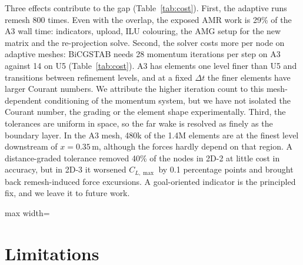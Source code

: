 \documentclass[preprint,12pt,number]{elsarticle}
\newcommand{\fittable}[1]{{\small\setlength{\tabcolsep}{4pt}\begin{adjustbox}{max width=\textwidth}\end{adjustbox}}}
\newcommand{\dt}{\Delta t}
\begin{document}
Three effects contribute to the gap (Table~\ref{tab:cost}). First, the adaptive runs remesh 800
times. Even with the overlap, the exposed AMR work is 29\% of the A3 wall time: indicators,
upload, ILU colouring, the AMG setup for the new matrix and the re-projection solve. Second,
the solver costs more per node on adaptive meshes: BiCGSTAB needs 28 momentum iterations per
step on A3 against 14 on U5 (Table~\ref{tab:cost}). A3 has elements one level finer than U5
and transitions between refinement levels, and at a fixed $\dt$ the finer elements have larger Courant
numbers. We attribute the higher iteration count to this mesh-dependent conditioning of the
momentum system, but we have not isolated the Courant number, the grading or the element shape
experimentally. Third, the tolerances are uniform in space, so the far wake is resolved as
finely as the boundary layer. In the A3 mesh, 480k of the 1.4M elements are at the finest
level downstream of $x = 0.35\,$m, although the forces hardly depend on that region. A
distance-graded tolerance removed 40\% of the nodes in 2D-2 at little cost in accuracy, but
in 2D-3 it worsened $C_{L,\max}$ by 0.1 percentage points and brought back remesh-induced force excursions.
A goal-oriented indicator \citep{becker2001,fidkowski2011} is the principled fix, and we leave
it to future work.

\begin{table}[!htbp]
\centering
\caption{Wall-time breakdown of the DFG 2D-2 A3 and U5 runs [s].}
\label{tab:cost}
\fittable{tables/tab_cost.tex}
\end{table}

\section{Limitations}
\label{sec:limits}
\end{document}
